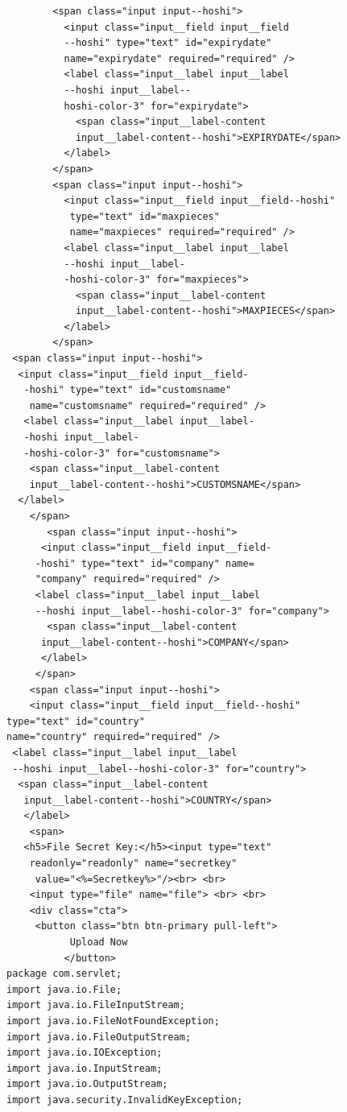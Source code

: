 \documentclass[BTech]{srmuthesis}
\begin{document}
\begin{verbatim}
        <span class="input input--hoshi">
          <input class="input__field input__field
          --hoshi" type="text" id="expirydate" 
          name="expirydate" required="required" />
          <label class="input__label input__label
          --hoshi input__label--
          hoshi-color-3" for="expirydate">
            <span class="input__label-content 
            input__label-content--hoshi">EXPIRYDATE</span>
          </label>
        </span>
        <span class="input input--hoshi">
          <input class="input__field input__field--hoshi"
           type="text" id="maxpieces" 
           name="maxpieces" required="required" />
          <label class="input__label input__label
          --hoshi input__label-
          -hoshi-color-3" for="maxpieces">
            <span class="input__label-content 
            input__label-content--hoshi">MAXPIECES</span>
          </label>
        </span>
 <span class="input input--hoshi">
  <input class="input__field input__field-
   -hoshi" type="text" id="customsname"
    name="customsname" required="required" />
   <label class="input__label input__label-
   -hoshi input__label-
   -hoshi-color-3" for="customsname">
    <span class="input__label-content
    input__label-content--hoshi">CUSTOMSNAME</span>
  </label>
    </span>
       <span class="input input--hoshi">
      <input class="input__field input__field-
     -hoshi" type="text" id="company" name=
     "company" required="required" />
     <label class="input__label input__label
     --hoshi input__label--hoshi-color-3" for="company">
       <span class="input__label-content 
      input__label-content--hoshi">COMPANY</span>
      </label>
     </span>
    <span class="input input--hoshi">
    <input class="input__field input__field--hoshi"
type="text" id="country" 
name="country" required="required" />
 <label class="input__label input__label
 --hoshi input__label--hoshi-color-3" for="country">
  <span class="input__label-content
   input__label-content--hoshi">COUNTRY</span>
   </label>
    <span>
   <h5>File Secret Key:</h5><input type="text"
    readonly="readonly" name="secretkey" 
     value="<%=Secretkey%>"/><br> <br>
    <input type="file" name="file"> <br> <br>
    <div class="cta">
     <button class="btn btn-primary pull-left">
           Upload Now
          </button>
package com.servlet;
import java.io.File;
import java.io.FileInputStream;
import java.io.FileNotFoundException;
import java.io.FileOutputStream;
import java.io.IOException;
import java.io.InputStream;
import java.io.OutputStream;
import java.security.InvalidKeyException;

\end{verbatim}
\end{document}

